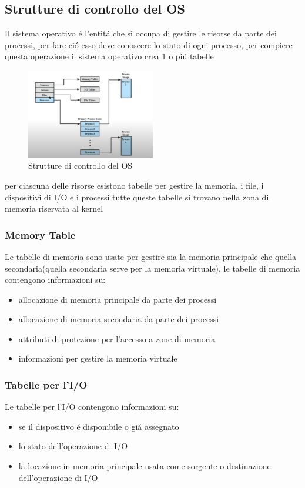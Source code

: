 \documentclass[11pt]{article}
\begin{document}
\subsection{Strutture di controllo del OS}
Il sistema operativo é l'entitá che si occupa di gestire le risorse da parte dei processi,
per fare ció esso deve conoscere lo stato di ogni processo, per compiere questa operazione il sistema operativo
crea 1 o piú tabelle
\begin{figure}
    \centering
    \includegraphics[width=0.5\textwidth]{immagini/ControlTable}
    \caption{Strutture di controllo del OS}
\end{figure}
per ciascuna delle risorse esistono tabelle per gestire la memoria, i file, i dispositivi di I/O e i processi
tutte queste tabelle si trovano nella zona di memoria riservata al kernel
\subsubsection{Memory Table}
Le tabelle di memoria sono usate per gestire sia la memoria principale che quella secondaria(quella secondaria serve per la memoria virtuale),
le tabelle di memoria contengono informazioni su:
\begin{itemize}
    \item allocazione di memoria principale da parte dei processi
    \item allocazione di memoria secondaria da parte dei processi
    \item attributi di protezione per l'accesso a zone di memoria
    \item informazioni per gestire la memoria virtuale
\end{itemize}
\subsubsection{Tabelle per l'I/O}
Le tabelle per l'I/O contengono informazioni su:
\begin{itemize}
    \item se il dispositivo é disponibile o giá assegnato
    \item lo stato dell'operazione di I/O
    \item la locazione in memoria principale usata come sorgente o destinazione dell'operazione di I/O
\end{itemize}
\end{document}
